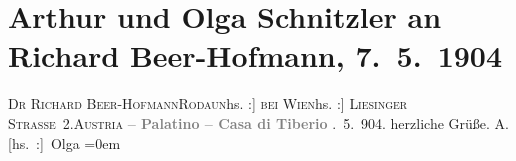 

         \renewcommand{\erwaehnteWerke}{}
               \section[Arthur und Olga Schnitzler an Richard Beer-Hofmann, 7. 5. 1904]{ Arthur und Olga Schnitzler an Richard Beer-Hofmann,
                    7. 5. 1904}\nopagebreak{}\rehead{ }\begin{ledgroupsized}[t]{13cm}\normalsize\beginnumbering \toendnotes[C]{\smallbreak\pagebreak[2]} 
\pstart{}{\pb}\textsc{Dr Richard Beer-Hofmann}\pend{}\pstart{}\textsc{Rodaun}\introOben{}{[}hs. :{]} \textsc{bei Wien}\introOben{}\pend{}\pstart{}{[}hs. :{]} \textsc{Liesinger Straße 2}.\pend{}\pstart{}\textsc{Austria}\pend{}{\bigskip}\pstart
           \noindent{}\centering{}{\pb}\textcolor{gray}{\textbf{ – Palatino – Casa di Tiberio}}\pend
           . 5. 904.\pend
           \pstart
           herzliche Grüße.\pend
           \pstart
           \spacefill\mbox{A.}{\\[\baselineskip]}\spacefill\mbox{{[}hs. :{]} Olga}\pend
           \leftskip=0em{}
         
         \endnumbering{}\end{ledgroupsized}  \newcommand{\dateiname}{L01398}\newcommand{\titel}{Arthur und Olga Schnitzler an Richard Beer-Hofmann, 7. 5. 1904}\newcommand{\editorInnen}{Martin Anton Müller und Gerd-Hermann Susen}
      